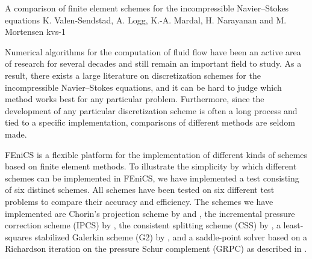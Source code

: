               {A comparison of finite element schemes for the incompressible
                 Navier--Stokes equations}
              {K. Valen-Sendstad, A. Logg, K.-A. Mardal, H. Narayanan and
                M. Mortensen}
              {kvs-1}

\newcommand{\css}[1]{$\mathrm{CSS}_{#1}$}

\newcommand{\scheme}[3]{%
\begin{figure}
  \begin{center}
    \small
    \begin{tabular}{l}
      \hline
      \textbf{Scheme #1:} #2 \\
      \hline
      \begin{minipage}{0.9\textwidth}
        \vspace{0.1cm}
        \begin{enumerate}
          #3
        \end{enumerate}
        \vspace{0.1cm}
      \end{minipage} \\
      \hline
    \end{tabular}
    \normalsize
  \end{center}
\end{figure}}


Numerical algorithms for the computation of fluid flow have been an
active area of research for several decades and still remain an
important field to study. As a result, there exists a large literature
on discretization schemes for the incompressible Navier--Stokes
equations, and it can be hard to judge which method works best for any
particular problem. Furthermore, since the development of any
particular discretization scheme is often a long process and tied to a
specific implementation, comparisons of different methods are seldom
made.

FEniCS is a flexible platform for the implementation of different
kinds of schemes based on finite element methods. To illustrate the
simplicity by which different schemes can be implemented in FEniCS, we
have implemented a test consisting of six distinct schemes. All
schemes have been tested on six different test problems to compare
their accuracy and efficiency. The schemes we have implemented are
Chorin's projection scheme by \citet{Chorin1968} and
\citet{Temam1969}, the incremental pressure correction scheme (IPCS)
by \citet{Goda1979}, the consistent splitting scheme (CSS) by
\citet{GuermondMinevShen2006}, a least-squares stabilized Galerkin
scheme (G2) by \citet{HoffmanJohnson2007}, and a saddle-point solver
based on a Richardson iteration on the pressure Schur complement
(GRPC) as described in \citet{Turek1996}.

